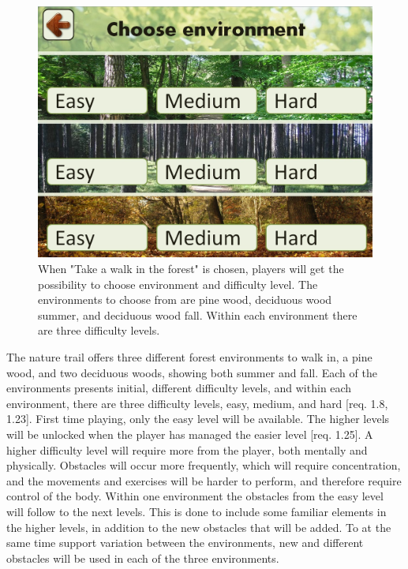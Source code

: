 \begin{figure} [H]
\centering
\includegraphics[scale=0.45]{chooseEnvironment.jpg}
\caption[Choice of environment and difficulty level]{When "Take a walk in the forest" is chosen, players will get the possibility to choose environment and difficulty level. The environments to choose from are pine wood, deciduous wood summer, and deciduous wood fall. Within each environment there are three difficulty levels.}
\label{fig:omgivelseNivaa}
\end{figure}

The nature trail offers three different forest environments to walk in, a pine wood, and two deciduous woods, showing both summer and fall. Each of the environments presents initial, different difficulty levels, and within each environment, there are three difficulty levels, easy, medium, and hard [req. 1.8, 1.23]. First time playing, only the easy level will be available. The higher levels will be unlocked when the player has managed the easier level [req. 1.25]. A higher difficulty level will require more from the player, both mentally and physically. Obstacles will occur more frequently, which will require concentration, and the movements and exercises will be harder to perform, and therefore require control of the body. Within one environment the obstacles from the easy level will follow to the next levels. This is done to include some familiar elements in the higher levels, in addition to the new obstacles that will be added. To at the same time support variation between the environments, new and different obstacles will be used in each of the three environments.  


